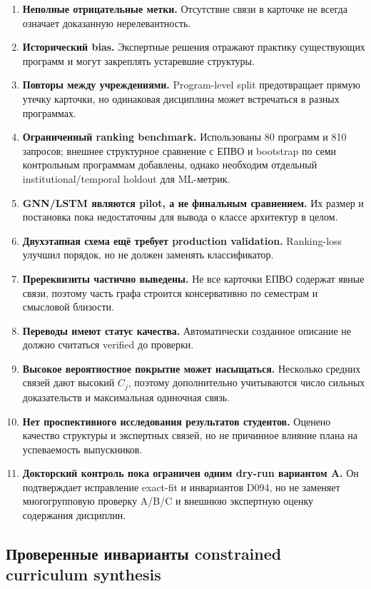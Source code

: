 \documentclass[twoside,11pt]{article}
\begin{document}
\begin{enumerate}
  \item \textbf{Неполные отрицательные метки.} Отсутствие связи в карточке не всегда означает доказанную нерелевантность.
  \item \textbf{Исторический bias.} Экспертные решения отражают практику существующих программ и могут закреплять устаревшие структуры.
  \item \textbf{Повторы между учреждениями.} Program-level split предотвращает прямую утечку карточки, но одинаковая дисциплина может встречаться в разных программах.
  \item \textbf{Ограниченный ranking benchmark.} Использованы 80 программ и 810 запросов; внешнее структурное сравнение с ЕПВО и bootstrap по семи контрольным программам добавлены, однако необходим отдельный institutional/temporal holdout для ML-метрик.
  \item \textbf{GNN/LSTM являются pilot, а не финальным сравнением.} Их размер и постановка пока недостаточны для вывода о классе архитектур в целом.
  \item \textbf{Двухэтапная схема ещё требует production validation.} Ranking-loss улучшил порядок, но не должен заменять классификатор.
  \item \textbf{Пререквизиты частично выведены.} Не все карточки ЕПВО содержат явные связи, поэтому часть графа строится консервативно по семестрам и смысловой близости.
  \item \textbf{Переводы имеют статус качества.} Автоматически созданное описание не должно считаться verified до проверки.
  \item \textbf{Высокое вероятностное покрытие может насыщаться.} Несколько средних связей дают высокий $C_j$, поэтому дополнительно учитываются число сильных доказательств и максимальная одиночная связь.
  \item \textbf{Нет проспективного исследования результатов студентов.} Оценено качество структуры и экспертных связей, но не причинное влияние плана на успеваемость выпускников.
  \item \textbf{Докторский контроль пока ограничен одним dry-run вариантом A.} Он подтверждает исправление exact-fit и инвариантов D094, но не заменяет многогрупповую проверку A/B/C и внешнюю экспертную оценку содержания дисциплин.
\end{enumerate}

\subsection{Проверенные инварианты constrained curriculum synthesis}
\end{document}
